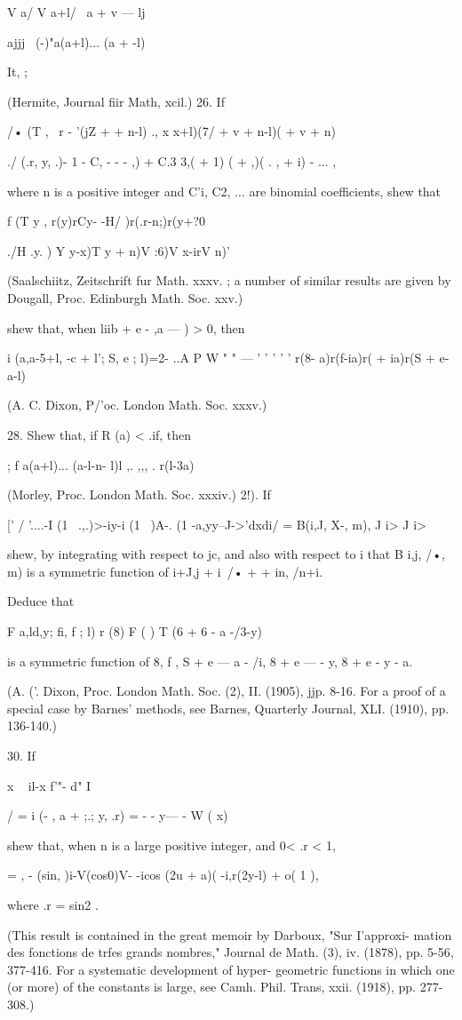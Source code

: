 V a/ V a+l/ \ a + v — lj 

ajjj \ (-)"a(a+l)... (a +  -l) 



It, ; 

(Hermite, Journal fiir Math, xcil.) 
26. If 

/• (T   , \ r - '(jZ +   + n-l) ., x x+l)(7/ + v + n-l)(  + v + n) 

./  (.r, y, .)- 1 -  C, - - - ,) + C.3 3,(  + 1) (  + ,)( . , + i) - ... , 

where n is a positive integer and  C'i,  C2, ... are binomial coefficients, shew that 

f (T y ,  r(y)rCy- -H/ )r(.r-n;)r(y+?0 

./H .y. ) Y y-x)T y + n)V :6)V x-irV n)' 

(Saalschiitz, Zeitschrift fur Math. xxxv. ; a number of similar results are given 
by Dougall, Proc. Edinburgh Math. Soc. xxv.) 

shew that, when liib + e -  ,a —  ) > 0, then 

i (a,a-5+l, -c + l'; S, e ; l)=2-  ..A  P W " " — 
 ' '   ' ' '   r(8- a)r(f-ia)r(  + ia)r(S + e-a-l) 

(A. C. Dixon, P/'oc. London Math. Soc. xxxv.) 

28. Shew that, if R (a) < .if, then 

; f a(a+l)... (a-l-n- l)l  ,. ,,, . r(l-3a) 

(Morley, Proc. London Math. Soc. xxxiv.) 
2!). If 

[' / '....-I (1 \ .,.)>-iy-i (1 \  )A-. (1 -a,yy--J->'dxdi/ = B(i,J, X-,   m), 
J i> J i> 

shew, by integrating with respect to jc, and also with respect to i  that B  i,j, /•,   m) is a 
symmetric function of i+J,j + i\ /• +     + in, /n+i. 

Deduce that 

F a,ld,y; fi, f ; l) r (8) F ( ) T (6 + 6 - a -/3-y) 

is a symmetric function of 8, f , S + e — a - /i, 8 + e —   - y, 8 + e - y - a. 

(A. ('. Dixon, Proc. London Math. Soc. (2), II. (1905), jjp. 8-16. For a proof of 
a special case by Barnes' methods, see Barnes, Quarterly Journal, XLI. 
(1910), pp. 136-140.) 

30. If 

x ~  il-x f'"- d" I 

/  = i (- , a + ;.; y, .r) = - - y—  -        W ( x) \ 

shew that, when n is a large positive integer, and 0< .r < 1, 

  = , -  (sin, )i-V(cos0)V- -icos (2u + a)( -i,r(2y-l)  + o( 1 ), 

where .r = sin2 . 

(This result is contained in the great memoir by Darboux, "Sur I'approxi- 
mation des fonctions de trfes grands nombres," Journal de Math. (3), iv. 
(1878), pp. 5-56, 377-416. For a systematic development of hyper- 
geometric functions in which one (or more) of the constants is large, see 
Camh. Phil. Trans, xxii. (1918), pp. 277-308.) 

